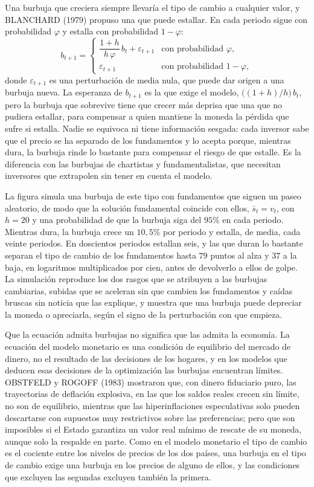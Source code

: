 \documentclass[10pt,a4paper]{article}
\begin{document}
Una burbuja que creciera siempre llevaría el tipo de cambio a cualquier valor, y BLANCHARD (1979) propuso una que puede estallar. En cada periodo sigue con probabilidad $\varphi$ y estalla con probabilidad $1-\varphi$:
$$b_{t+1}=\begin{cases}\dfrac{1+h}{h\,\varphi}\,b_t+\varepsilon_{t+1} & \text{con probabilidad }\varphi,\\[3mm] \varepsilon_{t+1} & \text{con probabilidad }1-\varphi,\end{cases}$$
donde $\varepsilon_{t+1}$ es una perturbación de media nula, que puede dar origen a una burbuja nueva. La esperanza de $b_{t+1}$ es la que exige el modelo, $\big((1+h)/h\big)\,b_t$, pero la burbuja que sobrevive tiene que crecer más deprisa que una que no pudiera estallar, para compensar a quien mantiene la moneda la pérdida que sufre si estalla. Nadie se equivoca ni tiene información sesgada: cada inversor sabe que el precio se ha separado de los fundamentos y lo acepta porque, mientras dura, la burbuja rinde lo bastante para compensar el riesgo de que estalle. Es la diferencia con las burbujas de chartistas y fundamentalistas, que necesitan inversores que extrapolen sin tener en cuenta el modelo.

La figura simula una burbuja de este tipo con fundamentos que siguen un paseo aleatorio, de modo que la solución fundamental coincide con ellos, $\bar s_t=v_t$, con $h=20$ y una probabilidad de que la burbuja siga del $95\%$ en cada periodo. Mientras dura, la burbuja crece un $10{,}5\%$ por periodo y estalla, de media, cada veinte periodos. En doscientos periodos estallan seis, y las que duran lo bastante separan el tipo de cambio de los fundamentos hasta $79$ puntos al alza y $37$ a la baja, en logaritmos multiplicados por cien, antes de devolverlo a ellos de golpe. La simulación reproduce los dos rasgos que se atribuyen a las burbujas cambiarias, subidas que se aceleran sin que cambien los fundamentos y caídas bruscas sin noticia que las explique, y muestra que una burbuja puede depreciar la moneda o apreciarla, según el signo de la perturbación con que empieza.

Que la ecuación admita burbujas no significa que las admita la economía. La ecuación del modelo monetario es una condición de equilibrio del mercado de dinero, no el resultado de las decisiones de los hogares, y en los modelos que deducen esas decisiones de la optimización las burbujas encuentran límites. OBSTFELD y ROGOFF (1983) mostraron que, con dinero fiduciario puro, las trayectorias de deflación explosiva, en las que los saldos reales crecen sin límite, no son de equilibrio, mientras que las hiperinflaciones especulativas solo pueden descartarse con supuestos muy restrictivos sobre las preferencias; pero que son imposibles si el Estado garantiza un valor real mínimo de rescate de su moneda, aunque solo la respalde en parte. Como en el modelo monetario el tipo de cambio es el cociente entre los niveles de precios de los dos países, una burbuja en el tipo de cambio exige una burbuja en los precios de alguno de ellos, y las condiciones que excluyen las segundas excluyen también la primera.
\end{document}
